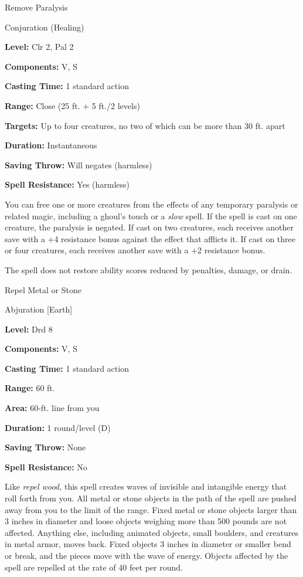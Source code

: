 \documentclass{article}
\begin{document}
\vspace{12pt}
Remove Paralysis

Conjuration (Healing)

\textbf{Level:} Clr 2, Pal 2

\textbf{Components:} V, S

\textbf{Casting Time:} 1 standard action

\textbf{Range:} Close (25 ft. + 5 ft./2 levels)

\textbf{Targets:} Up to four creatures, no two of which can be more than 30 ft. 
apart

\textbf{Duration:} Instantaneous

\textbf{Saving Throw: }Will negates (harmless)

\textbf{Spell Resistance:} Yes (harmless)

You can free one or more creatures from the effects of any temporary paralysis 
or related magic, including a ghoul's touch or a \textit{slow }spell. If the spell 
is cast on one creature, the paralysis is negated. If cast on two creatures, each 
receives another save with a +4 resistance bonus against the effect that afflicts 
it. If cast on three or four creatures, each receives another save with a +2 resistance 
bonus.

The spell does not restore ability scores reduced by penalties, damage, or drain.

\vspace{12pt}
Repel Metal or Stone

Abjuration [Earth]

\textbf{Level:} Drd 8

\textbf{Components:} V, S

\textbf{Casting Time:} 1 standard action

\textbf{Range:} 60 ft.

\textbf{Area:} 60-ft. line from you

\textbf{Duration:} 1 round/level (D)

\textbf{Saving Throw:} None

\textbf{Spell Resistance:} No

Like \textit{repel wood, }this spell creates waves of invisible and intangible 
energy that roll forth from you. All metal or stone objects in the path of the 
spell are pushed away from you to the limit of the range. Fixed metal or stone 
objects larger than 3 inches in diameter and loose objects weighing more than 500 
pounds are not affected. Anything else, including animated objects, small boulders, 
and creatures in metal armor, moves back. Fixed objects 3 inches in diameter or 
smaller bend or break, and the pieces move with the wave of energy. Objects affected 
by the spell are repelled at the rate of 40 feet per round.
\end{document}
